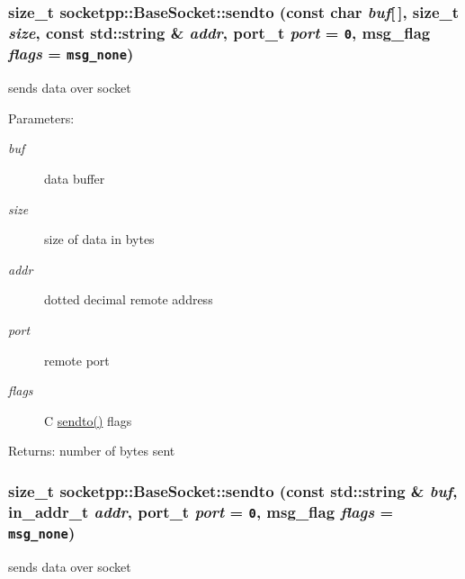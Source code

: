 \begin{CompactItemize}
{\subsubsection[{sendto}]{\setlength{\rightskip}{0pt plus 5cm}size\_\-t socketpp::BaseSocket::sendto (const char {\em buf}\mbox{[}$\,$\mbox{]}, \/  size\_\-t {\em size}, \/  const std::string \& {\em addr}, \/  port\_\-t {\em port} = {\tt 0}, \/  msg\_\-flag {\em flags} = {\tt msg\_\-none})}}
\label{classsocketpp_1_1BaseSocket_33e5d93278884480c62a1586a2a4a114}


sends data over socket 

\begin{Desc}
\item[Parameters:]
\begin{description}
\item[{\em buf}]data buffer \item[{\em size}]size of data in bytes \item[{\em addr}]dotted decimal remote address \item[{\em port}]remote port \item[{\em flags}]C \hyperlink{classsocketpp_1_1BaseSocket_d6df36281c6fce81e5c4c493ac91a6f8}{sendto()} flags \end{description}
\end{Desc}
\begin{Desc}
\item[Returns:]number of bytes sent \end{Desc}
\hypertarget{classsocketpp_1_1BaseSocket_5a2b11a5b30d54cc303f480eeb5642b1}{
\subsubsection[{sendto}]{\setlength{\rightskip}{0pt plus 5cm}size\_\-t socketpp::BaseSocket::sendto (const std::string \& {\em buf}, \/  in\_\-addr\_\-t {\em addr}, \/  port\_\-t {\em port} = {\tt 0}, \/  msg\_\-flag {\em flags} = {\tt msg\_\-none})}}
\label{classsocketpp_1_1BaseSocket_5a2b11a5b30d54cc303f480eeb5642b1}


sends data over socket 


\end{CompactItemize}
